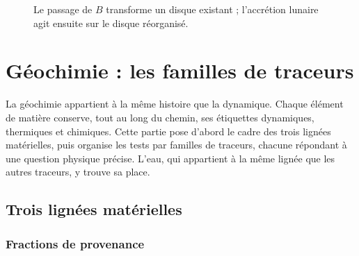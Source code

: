 \documentclass[11pt,a4paper,openany]{report}
\begin{document}
\begin{figure}[htbp]
\centering
{}
\caption{Le passage de $B$ transforme un disque existant ; l'accrétion lunaire agit ensuite sur le
disque réorganisé.}
\label{fig:flux}
\end{figure}

\part{Géochimie : les familles de traceurs}
\label{part:geochimie}

\noindent
La géochimie appartient à la même histoire que la dynamique. Chaque élément de matière
conserve, tout au long du chemin, ses étiquettes dynamiques, thermiques et chimiques. Cette
partie pose d'abord le cadre des trois lignées matérielles, puis organise les tests par familles de
traceurs, chacune répondant à une question physique précise. L'eau, qui appartient à la même
lignée que les autres traceurs, y trouve sa place.

\chapter{Trois lignées matérielles}
\label{sec:geochimie}

\section{Fractions de provenance}
\end{document}

